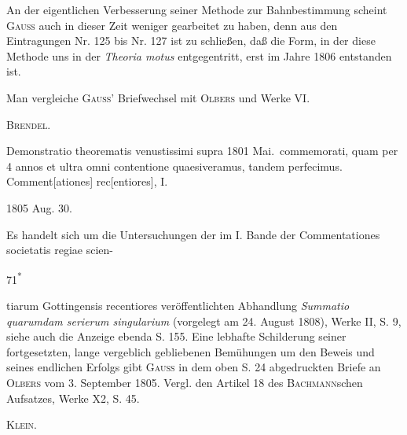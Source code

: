 \par\noindent\hspace*{\parindent}An der eigentlichen Verbesserung seiner Methode zur Bahnbestimmung scheint \textsc{Gauss} auch in dieser Zeit weniger gearbeitet zu haben, denn aus den Eintragungen Nr. 125 bis Nr. 127 ist zu schließen, daß die Form, in der diese Methode uns in der \textit{Theoria motus} entgegentritt, erst im Jahre 1806 entstanden ist.
\par\noindent\hspace*{\parindent}Man vergleiche \textsc{Gauss}' Briefwechsel mit \textsc{Olbers} und Werke VI.
\par\noindent\hfill\textsc{Brendel.}
\par\endgroup

\begingroup\renewcommand{\thefootnote}{[*)]}
\noindent\hspace*{\parindent}Demonstratio theorematis venustissimi supra 1801 Mai.\footnotemark\ commemorati, quam per 4 annos et ultra omni contentione quaesiveramus, tandem perfecimus. Comment[ationes] rec[entiores], I.
\renewcommand{\thefootnote}{[*)}
\footnotetext{Nr. 118, oben S. 560.]}
\par\noindent\hfill 1805 Aug. 30.
\par\endgroup
\par\medskip\begingroup\small
\noindent\hspace*{\parindent}Es handelt sich um die Untersuchungen der im I. Bande der Commentationes societatis regiae \mbox{scien-}
\par\endgroup
\par\medskip\noindent\hfill 71\textsuperscript{*}
\clearpage{}
\par\begingroup\small
\noindent tiarum Gottingensis recentiores veröffentlichten Abhandlung \textit{Summatio quarumdam serierum singularium} (vorgelegt am 24. August 1808), Werke II, S. 9, siehe auch die Anzeige ebenda S. 155. Eine lebhafte Schilderung seiner fortgesetzten, lange vergeblich gebliebenen Bemühungen um den Beweis und seines endlichen Erfolgs gibt \textsc{Gauss} in dem oben S. 24 abgedruckten Briefe an \textsc{Olbers} vom 3. September 1805. Vergl. den Artikel 18 des \textsc{Bachmann}schen Aufsatzes, Werke X2, S. 45.
\par\noindent\hfill\textsc{Klein.}
\par\endgroup

